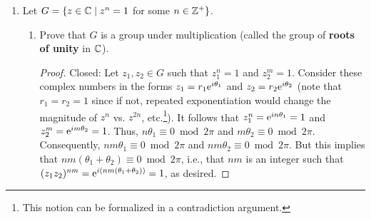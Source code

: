 \documentclass[../main.tex]{subfiles}
\begin{document}
\begin{enumerate}[label={\textbf{\arabic*.}}]
\begin{enumerate}[label={\textbf{(\alph*)}}]
\begin{proof}[Answer]
            Not closed: $|\frac{2}{3}+\frac{2}{3}|=|\frac{4}{3}|\geq 1$, for instance.
        \end{proof}
        \item The set of rational numbers of absolute value $\geq 1$ together with 0.
        \begin{proof}[Answer]
            No.\par
            Not closed: $|\frac{3}{2}+(-\frac{1}{1})|=|-\frac{1}{2}|=\frac{1}{2}<1$, for instance.
        \end{proof}
        \item The set of rational numbers with denominators equal to 1 or 2.
        \begin{proof}[Answer]
            Yes.\par
            Closed: $\lcm(1,1)=1$, $\lcm(1,2)=2$, and $\lcm(2,2)=2$, so the denominator stays within the constraints of the set.\par
            Axioms (i-iii): Symmetric to (a).
        \end{proof}
        \item The set of rational numbers with denominators equal to 1, 2, or 3.
        \begin{proof}[Answer]
            No.\par
            Not closed: $\lcm(2,3)=6\notin\{1,2,3\}$, so $\frac{1}{2}+\frac{1}{3}=\frac{5}{6}$, for instance.
        \end{proof}
    \end{enumerate}
    \item Let $G=\{z\in\C\mid z^n=1$ for some $n\in\Z^+\}$.
    \begin{enumerate}[label={\textbf{(\alph*)}}]
        \item Prove that $G$ is a group under multiplication (called the group of \textbf{roots of unity} in $\C$).
        \begin{proof}
            Closed: Let $z_1,z_2\in G$ such that $z_1^n=1$ and $z_2^m=1$. Consider these complex numbers in the forms $z_1=r_1\e[i\theta_1]$ and $z_2=r_2\e[i\theta_2]$ (note that $r_1=r_2=1$ since if not, repeated exponentiation would change the magnitude of $z^n$ vs. $z^{2n}$, etc.\footnote{This notion can be formalized in a contradiction argument.}). It follows that $z_1^n=\e[in\theta_1]=1$ and $z_2^m=\e[im\theta_2]=1$. Thus, $n\theta_1\equiv 0\bmod 2\pi$ and $m\theta_2\equiv 0\bmod 2\pi$. Consequently, $nm\theta_1\equiv 0\bmod 2\pi$ and $nm\theta_2\equiv 0\bmod 2\pi$. But this implies that $nm(\theta_1+\theta_2)\equiv 0\bmod 2\pi$, i.e., that $nm$ is an integer such that $(z_1z_2)^{nm}=\e[i(nm(\theta_1+\theta_2))]=1$, as desired.\par

\end{proof}
\end{enumerate}
\end{enumerate}
\end{document}
